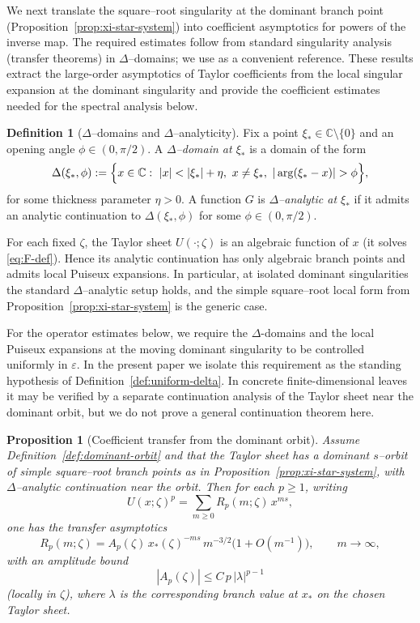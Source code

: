 \documentclass[11pt]{amsart}
\numberwithin{equation}{section}
\theoremstyle{plain}
\newtheorem{proposition}[theorem]{Proposition}
\theoremstyle{definition}
\newtheorem{definition}[theorem]{Definition}
\theoremstyle{remark}
\newcommand{\CC}{\mathbb{C}}
\begin{document}
We next translate the square--root singularity at the dominant branch point
(Proposition~\ref{prop:xi-star-system}) into coefficient asymptotics for powers of the inverse map.
The required estimates follow from standard singularity analysis (transfer theorems) in
$\Delta$--domains; we use \cite[Ch.~VI]{FlajoletSedgewick2009} as a convenient reference.
These results extract the large-order asymptotics
of Taylor coefficients from the local singular expansion at the dominant singularity
and provide the coefficient estimates needed for the spectral analysis below.


\begin{definition}[$\Delta$--domains and $\Delta$--analyticity]\label{def:delta-domain}
	Fix a point $\xi_*\in\CC\setminus\{0\}$ and an opening angle $\phi\in(0,\pi/2)$. A \emph{$\Delta$--domain at $\xi_*$} is a domain
	of the form
	\[
		\Delta(\xi_*,\phi)
		:=
		\Bigl\{x\in\CC:\ |x|<|\xi_*|+\eta,\ x\neq\xi_*,\ |\arg(\xi_*-x)|>\phi\Bigr\},
	\]
	for some thickness parameter $\eta>0$. A function $G$ is \emph{$\Delta$--analytic at $\xi_*$} if it admits an analytic
	continuation to $\Delta(\xi_*,\phi)$ for some $\phi\in(0,\pi/2)$.
\end{definition}

For each fixed $\zeta$, the Taylor sheet $U(\cdot;\zeta)$ is an algebraic function of $x$ (it solves
\eqref{eq:F-def}). Hence its analytic continuation has only algebraic branch points and admits local
Puiseux expansions. In particular, at isolated dominant singularities the standard $\Delta$--analytic
setup holds, and the simple square--root local form from Proposition~\ref{prop:xi-star-system} is the
generic case.

For the operator estimates below, we require the \(\Delta\)-domains and the
local Puiseux expansions at the moving dominant singularity to be controlled
uniformly in \(\varepsilon\). In the present paper we isolate this requirement
as the standing hypothesis of Definition~\ref{def:uniform-delta}. In concrete
finite-dimensional leaves it may be verified by a separate continuation
analysis of the Taylor sheet near the dominant orbit, but we do not prove a
general continuation theorem here.

\begin{proposition}[Coefficient transfer from the dominant orbit]
\label{prop:transfer-dominant}
Assume Definition~\ref{def:dominant-orbit} and that the Taylor sheet has a dominant $s$--orbit of
simple square--root branch points as in Proposition~\ref{prop:xi-star-system}, with $\Delta$--analytic
continuation near the orbit.
Then for each $p\ge1$, writing
\[
	U(x;\zeta)^p=\sum_{m\ge0}R_p(m;\zeta)\,x^{ms},
\]
one has the transfer asymptotics
\[
	R_p(m;\zeta)=A_p(\zeta)\,x_*(\zeta)^{-ms}\,m^{-3/2}\bigl(1+O(m^{-1})\bigr),
	\qquad m\to\infty,
\]
with an amplitude bound
\[
|A_p(\zeta)|\le C\,p\,|\lambda|^{p-1}
\]
(locally in $\zeta$), where $\lambda$ is the corresponding branch value at $x_*$ on the chosen
Taylor sheet.
\end{proposition}
\end{document}
